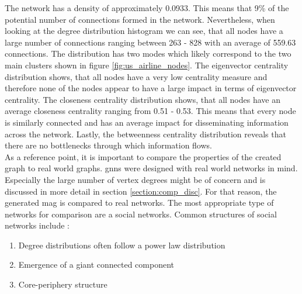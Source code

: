   \noindent The network has a density of approximately 0.0933. This means that 
  9\% of the potential number of connections formed in the network.
  Nevertheless, when looking at the degree distribution histogram we can see, 
  that all nodes have a large number of connections ranging between 263 -
  828 with an average of 559.63 connections. The distribution has two
  modes which likely correspond to the two main clusters shown in figure
  \ref{fig:us_airline_nodes}. The eigenvector centrality distribution shows, 
  that all nodes have a very low centrality measure and therefore none of the 
  nodes appear to have a large impact in terms of eigenvector centrality. The 
  closeness centrality distribution shows, that all nodes have an average 
  closeness centrality ranging from 0.51 - 0.53. This means that every node is 
  similarly connected and has an average impact for disseminating information 
  across the network. Lastly, the betweenness centrality distribution reveals 
  that there are no bottlenecks through which information flows. \\

  \noindent As a reference point, it is important to compare the properties of
  the created graph to real world graphs. \acsp{gnn} were designed with real
  world networks in mind. Especially the large number of vertex degrees might
  be of concern and is discussed in more detail in section 
  \ref{section:comp_disc}. For that reason, the generated \acs{mag} is
  compared to real networks. The most appropriate type of networks for comparison 
  are a social networks. Common structures of social networks include 
  \citep{watts1998collective,newman2006structure,Newman2010,kim2012multiplicative}:

  \begin{enumerate}
    \item Degree distributions often follow a power law distribution
    \item Emergence of a giant connected component
    \item Core-periphery structure
  \end{enumerate}

